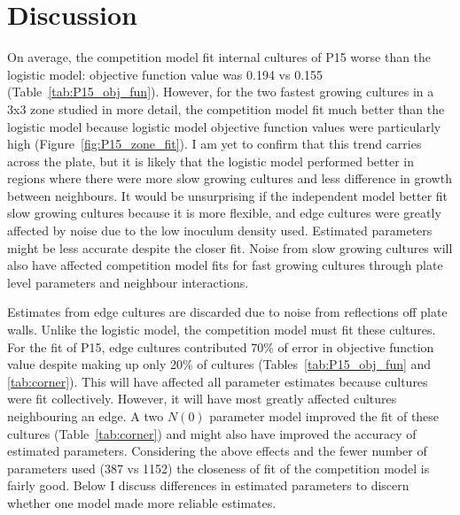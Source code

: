 \graphicspath{{images/}}

\section{Discussion}
\label{sec:discussion}


On average, the competition model fit internal cultures of P15 worse
than the logistic model: objective function value was 0.194 vs 0.155
(Table~\ref{tab:P15_obj_fun}). However, for the two fastest growing
cultures in a 3x3 zone studied in more detail, the competition model
fit much better than the logistic model because logistic model
objective function values were particularly high
(Figure~\ref{fig:P15_zone_fit}). I am yet to confirm that this trend
carries across the plate, but it is likely that the logistic model
performed better in regions where there were more slow growing
cultures and less difference in growth between neighbours. It would be
unsurprising if the independent model better fit slow growing cultures
because it is more flexible, and edge cultures were greatly affected
by noise due to the low inoculum density used.
Estimated parameters might be less accurate despite the closer
fit. Noise from slow growing cultures will also have affected
competition model fits for fast growing cultures through plate level
parameters and neighbour interactions.

Estimates from edge cultures are discarded due to noise from
reflections off plate walls. Unlike the logistic model, the
competition model must fit these cultures. For the fit of P15, edge
cultures contributed 70\% of error in objective function value despite
making up only 20\% of cultures (Tables~\ref{tab:P15_obj_fun} and
\ref{tab:corner}). This will have affected all parameter estimates
because cultures were fit collectively. However, it will have most
greatly affected cultures neighbouring an edge. A two \(N(0)\)
parameter model improved the fit of these cultures
(Table~\ref{tab:corner}) and might also have improved the accuracy of
estimated parameters.
Considering the above effects and the fewer number of parameters used
(387 vs 1152) the closeness of fit of the competition model is fairly
good. Below I discuss differences in estimated parameters to discern
whether one model made more reliable estimates.

